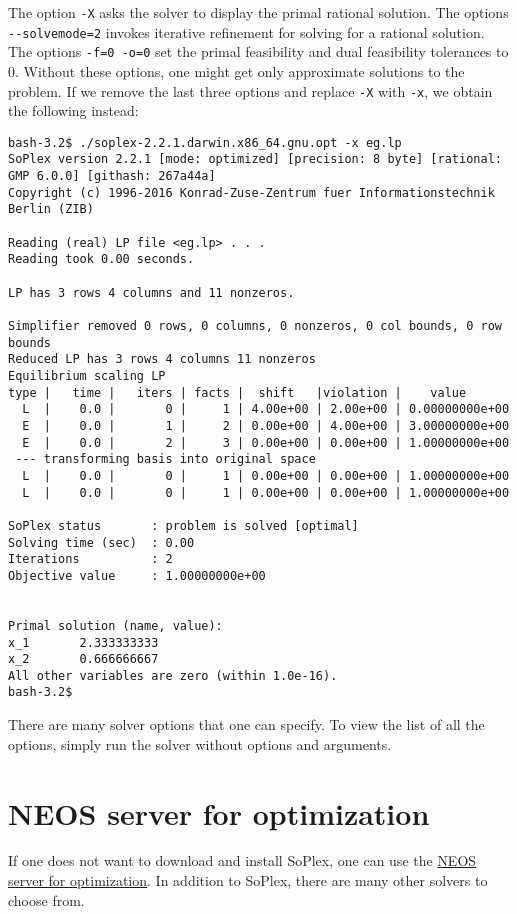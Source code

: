 The option \texttt{-X} asks the solver to display the primal rational
solution. The options \texttt{-\/-solvemode=2} invokes iterative
refinement for solving for a rational solution. The options
\texttt{-f=0\ -o=0} set the primal feasibility and dual feasibility
tolerances to 0. Without these options, one might get only approximate
solutions to the problem. If we remove the last three options and
replace \texttt{-X} with \texttt{-x}, we obtain the following instead:

{\footnotesize
\begin{verbatim}
bash-3.2$ ./soplex-2.2.1.darwin.x86_64.gnu.opt -x eg.lp
SoPlex version 2.2.1 [mode: optimized] [precision: 8 byte] [rational: GMP 6.0.0] [githash: 267a44a]
Copyright (c) 1996-2016 Konrad-Zuse-Zentrum fuer Informationstechnik Berlin (ZIB)

Reading (real) LP file <eg.lp> . . .
Reading took 0.00 seconds.

LP has 3 rows 4 columns and 11 nonzeros.

Simplifier removed 0 rows, 0 columns, 0 nonzeros, 0 col bounds, 0 row bounds
Reduced LP has 3 rows 4 columns 11 nonzeros
Equilibrium scaling LP
type |   time |   iters | facts |  shift   |violation |    value
  L  |    0.0 |       0 |     1 | 4.00e+00 | 2.00e+00 | 0.00000000e+00
  E  |    0.0 |       1 |     2 | 0.00e+00 | 4.00e+00 | 3.00000000e+00
  E  |    0.0 |       2 |     3 | 0.00e+00 | 0.00e+00 | 1.00000000e+00
 --- transforming basis into original space
  L  |    0.0 |       0 |     1 | 0.00e+00 | 0.00e+00 | 1.00000000e+00
  L  |    0.0 |       0 |     1 | 0.00e+00 | 0.00e+00 | 1.00000000e+00

SoPlex status       : problem is solved [optimal]
Solving time (sec)  : 0.00
Iterations          : 2
Objective value     : 1.00000000e+00


Primal solution (name, value):
x_1       2.333333333
x_2       0.666666667
All other variables are zero (within 1.0e-16).
bash-3.2$ 
\end{verbatim}
}

There are many solver options that one can specify. To view the list of
all the options, simply run the solver without options and arguments.

\section{NEOS server for
optimization}\label{neos-server-for-optimization}

If one does not want to download and install SoPlex, one can use the
\href{https://neos-server.org/neos/solvers/index.html}{NEOS server for
optimization}. In addition to SoPlex, there are many other solvers to
choose from.

